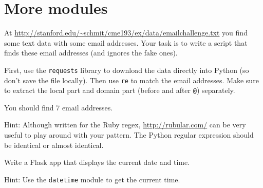 \section{More modules} %
\label{sec:more_modules}
\begin{questions}

At \url{http://stanford.edu/~schmit/cme193/ex/data/emailchallenge.txt} you find
some text data with some email addresses.
Your task is to write a script that finds these email addresses (and ignores the fake ones).

First, use the \texttt{requests} library to download the data directly into Python (so don't save the file locally).
Then use \texttt{re} to match the email addresses.
Make sure to extract the local part and domain part (before and after \texttt{@}) separately.

You should find 7 email addresses.

Hint: Although written for the Ruby regex, \url{http://rubular.com/} can be very useful
to play around with your pattern. The Python regular expression should be identical or almost identical.


Write a Flask app that displays the current date and time.

Hint: Use the \texttt{datetime} module to get the current time.

\end{questions}
